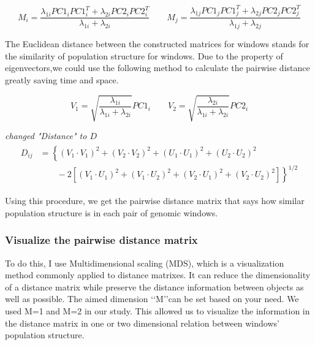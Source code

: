 \documentclass[11pt, oneside]{article}   	%
\newcommand{\plr}[1]{{\em \color{blue} #1}}
\begin{document}
\begin{equation}
M_{i}=\frac{\lambda _{1i}PC1_{i}PC1_{i}^{T}+\lambda _{2i}PC2_{i}PC2_{i}^{T}}{\lambda _{1i}+\lambda _{2i}} \qquad
M_{j}=\frac{\lambda _{1j}PC1_{j}PC1_{j}^{T}+\lambda _{2j}PC2_{j}PC2_{j}^{T}}{\lambda _{1j}+\lambda _{2j}}
\end{equation}

The Euclidean distance between the constructed matrices for windows stands for the
similarity of population structure for windows. Due to the property of eigenvectors,we
could use the following method to calculate the pairwise distance greatly saving time and space.

\begin{equation}
V_{1}=\sqrt{\frac{\lambda _{1i}}{\lambda _{1i}+\lambda _{2i}}}PC1_{i} \qquad
V_{2}=\sqrt{\frac{\lambda _{2i}}{\lambda _{1i}+\lambda _{2i}}}PC2_{i}
\end{equation}

\plr{changed "Distance" to $D$}
\begin{align}
    \begin{split}
    D_{ij} &= 
        \left \{
                \left ( 
                    V_{1}\cdot V_{1}^{} 
                \right )^{2}
                + \left ( V_{2}\cdot V_{2}^{} \right )^{2}
                + \left ( U_{1}\cdot U_{1}^{} \right )^{2} 
                +\left ( U_{2}\cdot U_{2}^{} \right )^{2} 
        \right. \\ 
        & \left. \qquad {}  
            -2\left [ 
                \left ( V_{1}\cdot U_{1}^{} \right )^{2}
                + \left ( V_{1}\cdot U_{2}^{} \right )^{2}
                + \left ( V_{2}\cdot U_{1}^{} \right )^{2} 
                + \left ( V_{2}\cdot U_{2}^{} \right )^{2}
            \right ]
        \right \}^{1/2}
    \end{split}
\end{align}

Using this procedure, 
we get the pairwise distance matrix that says how similar population structure is 
in each pair of genomic windows.
\subsubsection{Visualize the pairwise distance matrix}
To do this, I use Multidimensional scaling (MDS), 
which is a visualization method commonly applied to distance matrixes. 
It can reduce the dimensionality of a distance matrix while preserve the distance information between objects as well as possible. The aimed dimension \lq\lq M\rq\rq can be set based on your need. We used M=1 and M=2 in our study. This allowed us to visualize the information in the distance matrix in one or two dimensional relation between windows' population structure.
\end{document}
